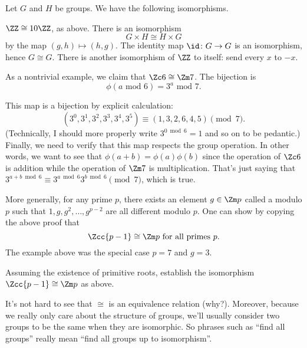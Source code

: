 \begin{example}
	Let $G$ and $H$ be groups. We have the following isomorphisms.
	\begin{enumerate}[(a)]
		\ii $\ZZ \cong 10 \ZZ$, as above.
		\ii There is an isomorphism
		\[ G \times H \cong H \times G\]
		by the map $(g,h) \mapsto (h,g)$.
		\ii The identity map $\id \colon G \to G$
		is an isomorphism, hence $G \cong G$.
		\ii There is another isomorphism of $\ZZ$ to itself: send every $x$ to $-x$.
	\end{enumerate}
\end{example}
\begin{example}
	As a nontrivial example, we claim that $\Zc 6 \cong \Zm 7$.
	The bijection is
	\[ \phi(\text{$a$ mod $6$}) = \text{$3^a$ mod $7$}. \]
	\begin{itemize}
		\ii This map is a bijection by explicit calculation:
		\[ (3^0, 3^1, 3^2, 3^3, 3^4, 3^5)
			\equiv (1,3,2,6,4,5) \pmod 7. \]
		(Technically, I should more properly write $3^{0 \bmod 6} = 1$ and so on to be pedantic.)
		\ii Finally, we need to verify that this map respects the group operation.
		In other words, we want to see that
		$\phi(a+b) = \phi(a) \phi(b)$
		since the operation of $\Zc 6$ is addition
		while the operation of $\Zm 7$ is multiplication.
		That's just saying that $3^{a+b \bmod 6} \equiv 3^{a \bmod 6} 3^{b \bmod 6} \pmod 7$,
		which is true.
	\end{itemize}
\end{example}
\begin{example}
	More generally, for any prime $p$, there exists
	an element $g \in \Zm p$ called a  modulo $p$
	such that $1, g, g^2, \dots, g^{p-2}$ are all different modulo $p$.
	One can show by copying the above proof that
	\[ \Zcc{p-1} \cong \Zm p \text{ for all primes $p$}. \]
	The example above was the special case $p=7$ and $g=3$.
\end{example}
\begin{exercise}
	Assuming the existence of primitive roots,
	establish the isomorphism $\Zcc{p-1} \cong \Zm p$ as above.
\end{exercise}

It's not hard to see that $\cong$ is an equivalence relation (why?).
Moreover, because we really only care about the structure of groups,
we'll usually consider two groups to be the same when they are isomorphic.
So phrases such as ``find all groups'' really mean
``find all groups up to isomorphism''.

